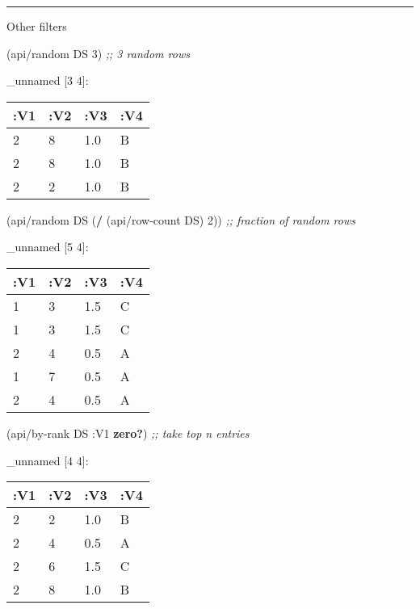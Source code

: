 \documentclass[]{article}
\newenvironment{Shaded}{\begin{snugshade}}{\end{snugshade}}
\newcommand{\AttributeTok}[1]{\textcolor[rgb]{0.77,0.63,0.00}{#1}}
\newcommand{\CommentTok}[1]{\textcolor[rgb]{0.56,0.35,0.01}{\textit{#1}}}
\newcommand{\DecValTok}[1]{\textcolor[rgb]{0.00,0.00,0.81}{#1}}
\newcommand{\KeywordTok}[1]{\textcolor[rgb]{0.13,0.29,0.53}{\textbf{#1}}}
\newcommand{\NormalTok}[1]{#1}
\begin{document}
\begin{center}\rule{0.5\linewidth}{0.5pt}\end{center}

Other filters

\begin{Shaded}
\begin{Highlighting}[]
\NormalTok{(api/random DS }\DecValTok{3}\NormalTok{) }\CommentTok{;; 3 random rows}
\end{Highlighting}
\end{Shaded}

\_unnamed {[}3 4{]}:

\begin{longtable}[]{@{}llll@{}}
\toprule
:V1 & :V2 & :V3 & :V4\tabularnewline
\midrule
\endhead
2 & 8 & 1.0 & B\tabularnewline
2 & 8 & 1.0 & B\tabularnewline
2 & 2 & 1.0 & B\tabularnewline
\bottomrule
\end{longtable}

\begin{Shaded}
\begin{Highlighting}[]
\NormalTok{(api/random DS (}\KeywordTok{/}\NormalTok{ (api/row-count DS) }\DecValTok{2}\NormalTok{)) }\CommentTok{;; fraction of random rows}
\end{Highlighting}
\end{Shaded}

\_unnamed {[}5 4{]}:

\begin{longtable}[]{@{}llll@{}}
\toprule
:V1 & :V2 & :V3 & :V4\tabularnewline
\midrule
\endhead
1 & 3 & 1.5 & C\tabularnewline
1 & 3 & 1.5 & C\tabularnewline
2 & 4 & 0.5 & A\tabularnewline
1 & 7 & 0.5 & A\tabularnewline
2 & 4 & 0.5 & A\tabularnewline
\bottomrule
\end{longtable}

\begin{Shaded}
\begin{Highlighting}[]
\NormalTok{(api/by-rank DS }\AttributeTok{:V1} \KeywordTok{zero?}\NormalTok{) }\CommentTok{;; take top n entries}
\end{Highlighting}
\end{Shaded}

\_unnamed {[}4 4{]}:

\begin{longtable}[]{@{}llll@{}}
\toprule
:V1 & :V2 & :V3 & :V4\tabularnewline
\midrule
\endhead
2 & 2 & 1.0 & B\tabularnewline
2 & 4 & 0.5 & A\tabularnewline
2 & 6 & 1.5 & C\tabularnewline
2 & 8 & 1.0 & B\tabularnewline
\bottomrule
\end{longtable}
\end{document}
